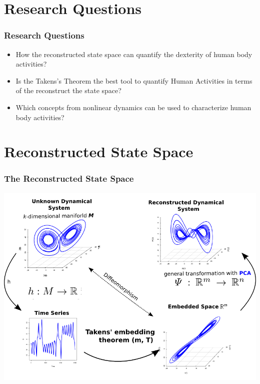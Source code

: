 \documentclass{beamer}
\begin{document}
\section{Research Questions}

\begin{frame}
	\frametitle{Research Questions}

    \begin{itemize}
    \item How the reconstructed state space can quantify the dexterity 
          of human body activities?
    \item Is the Takens's Theorem the best tool to quantify Human Activities
          in terms of the reconstruct the state space?
    \item Which concepts from nonlinear dynamics can be used to characterize
          human body activities?
    \end{itemize}

\end{frame}


\section{Reconstructed State Space}




\begin{frame}
\frametitle{The Reconstructed State Space}
\vspace{-5mm}

 \includegraphics[scale=.4]{takens_theorem_v2} 


\end{frame}
\end{document}
